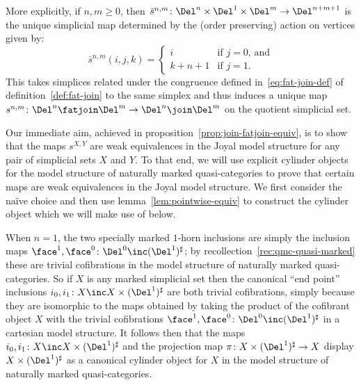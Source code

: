 \begin{obs}
    More explicitly, if $n,m\geq 0$, then $\bar{s}^{n,m}\colon\Del^n\times\Del^1\times\Del^m\to\Del^{n+m+1}$ is the unique simplicial map determined by the (order preserving) action on vertices given by:
    \begin{equation}\label{eq:tnm-def}
      \bar{s}^{n,m}(i,j,k) = 
      \begin{cases}
        i & \text{if $j=0$, and} \\
        k+n+1 & \text{if $j=1$.}
      \end{cases}
    \end{equation}
    This takes simplices related under the congruence defined in~\eqref{eq:fat-join-def} of definition~\ref{def:fat-join} to the same simplex and thus induces a unique map $s^{n,m}\colon\Del^n\fatjoin\Del^m\to\Del^n\join\Del^m$ on the quotient simplicial set.
  \end{obs}

Our immediate aim, achieved in proposition~\ref{prop:join-fatjoin-equiv}, is to show that the maps $s^{X,Y}$ are weak equivalences in the Joyal model structure for any pair of simplicial sets $X$ and $Y$. To that end,  we will use explicit cylinder objects for the model structure of naturally marked quasi-categories  to prove that certain maps are weak equivalences in the Joyal model structure. We first consider the na\"{i}ve choice and then use lemma~\ref{lem:pointwise-equiv} to construct the cylinder object which we will make use of below.%

  \begin{obs}\label{obs:Kan-cylinder}  When $n=1$, the two specially marked $1$-horn inclusions are simply the inclusion maps $\face^1,\face^0\colon\Del^0\inc(\Del^1)^\sharp$; by recollection~\ref{rec:qmc-quasi-marked} these are trivial cofibrations in the model structure of naturally marked quasi-categories. So if $X$ is any marked simplicial set then the canonical ``end point'' inclusions $i_0,i_1\colon X\inc X\times(\Del^1)^\sharp$ are both trivial cofibrations, simply because they are isomorphic to the maps obtained by taking the product of the cofibrant object $X$ with the trivial cofibrations $\face^1,\face^0\colon\Del^0\inc(\Del^1)^\sharp$ in a cartesian model structure. It follows then that the maps $i_0,i_1\colon X\inc X\times(\Del^1)^\sharp$ and the projection map $\pi\colon X\times(\Del^1)^\sharp\to X$ display $X\times(\Del^1)^\sharp$ as a canonical cylinder object for $X$ in the model structure of naturally marked quasi-categories.
\end{obs}

